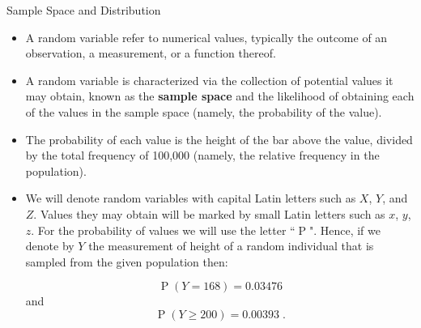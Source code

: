 \documentclass[10pt]{beamer}\usepackage[]{graphicx}\usepackage[]{color}
\newcommand{\Prob}{\operatorname{P}}
\begin{document}
\begin{frame}[fragile]{Sample Space and Distribution}
	\small
	\begin{itemize}[<+->]
		
		\item A random variable refer to numerical values, typically the outcome of an
		observation, a measurement, or a function thereof.
		
		\item A random variable is characterized via the collection of potential
		values it may obtain, known as the \textbf{sample space} and the likelihood of
		obtaining each of the values in the sample space (namely, the
		probability of the value).
		
		\item The probability of each value is the height
		of the bar above the value, divided by the total frequency of 100,000
		(namely, the relative frequency in the population).
		
		\item We will denote random variables with capital Latin letters such as $X$,
		$Y$, and $Z$. Values they may obtain will be marked by small Latin
		letters such as $x$, $y$, $z$. For the probability of values we will use
		the letter “$\Prob$". Hence, if we denote by $Y$ the measurement of
		height of a random individual that is sampled from the given population
		then: 
		
		$$\Prob(Y = 168) = 0.03476$$ and 
		$$\Prob(Y \geq 200) = 0.00393\;.$$
		
	\end{itemize}
	
\end{frame}
\end{document}
